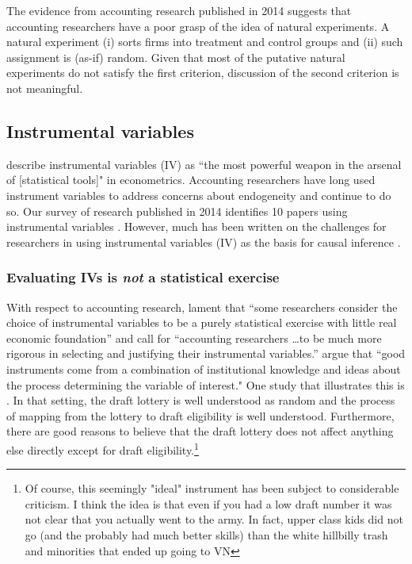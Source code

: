 \documentclass[11pt]{amsart}
\begin{document}
The evidence from accounting research published in 2014 suggests that accounting researchers have a poor grasp of the idea of natural experiments.
A natural experiment (i) sorts firms into treatment and control groups and (ii) such assignment is (as-if) random.
Given that most of the putative natural experiments do not satisfy the first criterion, discussion of the second criterion is not meaningful.


\subsection{Instrumental variables}
\citet[p.114]{Angrist:2008vk} describe instrumental variables (IV) as ``the most powerful weapon in the arsenal of [statistical tools]" in econometrics. 
Accounting researchers have long used instrument variables to address concerns about endogeneity \citep{Larcker:2010fq} and continue to do so.  Our survey of research published in 2014 identifies 10 papers using instrumental variables \citep{Cannon:2014im,Cohen:2014jl,Kim:2014fm,Vermeer:2014bs,Fox:2014io,Guedhami:2013cj,Houston:2014hv,deFranco:2014ct,Erkens:2014hj,Correia:2014fp}. 
However, much has been written on the challenges for researchers in using instrumental variables (IV) as the basis for causal inference \citep[e.g.,][]{Roberts:2013cz}. 

\subsubsection{Evaluating IVs is \emph{not} a statistical exercise}

With respect to accounting research, \citet{Larcker:2010fq} lament that ``some researchers consider the choice of instrumental variables to be a purely statistical exercise with little real economic foundation'' and call for 
``accounting researchers \dots to be much more rigorous in selecting and justifying their instrumental variables.'' 
\citet[p.117]{Angrist:2008vk} argue that ``good instruments come from a combination of institutional knowledge and ideas about the process determining the variable of interest."
One study that illustrates this is \cite{Angrist:2008vk}.
In that setting, the draft lottery is well understood as random and the process of mapping from the lottery to draft eligibility is well understood.
Furthermore, there are good reasons to believe that the draft lottery does not affect anything else directly except for draft eligibility.\footnote {Of course, this seemingly "ideal" instrument has been subject to considerable criticism. I think the idea is that even if you had a low draft number it was not clear that you actually went to the army.  In fact, upper class kids did not go (and the probably had much better skills) than the white hillbilly trash and minorities that ended up going to VN}
\end{document}
